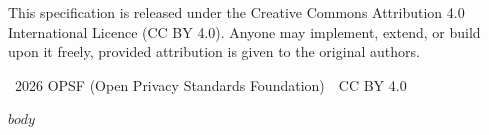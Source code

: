 \documentclass[11pt,a4paper]{article}
\newcommand{\pctsep}{\,\textperiodcentered\,}
\begin{document}
\vspace{0.3em}
{\small This specification is released under the Creative Commons Attribution 4.0 International Licence (CC BY 4.0). Anyone may implement, extend, or build upon it freely, provided attribution is given to the original authors.}

\vspace{1em}
\begin{center}
{\small\color{pctgray}\textcopyright\ 2026 OPSF (Open Privacy Standards Foundation) \pctsep{} CC BY 4.0}
\end{center}

$body$
\end{document}
